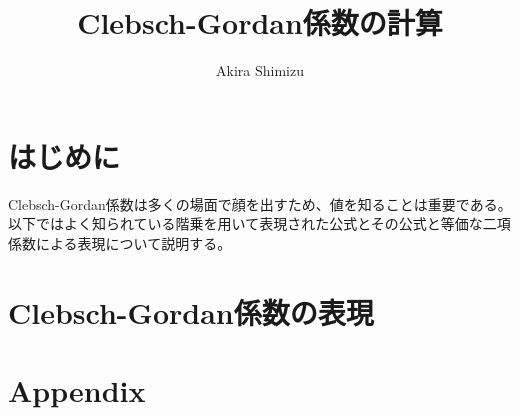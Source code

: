 \documentclass[dvipdfmx]{jsarticle}
\begin{document}
\title{Clebsch-Gordan係数の計算}
\author{Akira Shimizu}
\thispagestyle{empty}
\maketitle

\tableofcontents
\clearpage

\section{はじめに}

Clebsch-Gordan係数は多くの場面で顔を出すため、値を知ることは重要である。
以下ではよく知られている階乗を用いて表現された公式とその公式と等価な二項係数による表現について説明する。

\section{Clebsch-Gordan係数の表現}




\newpage
\section{Appendix}

\end{document}
